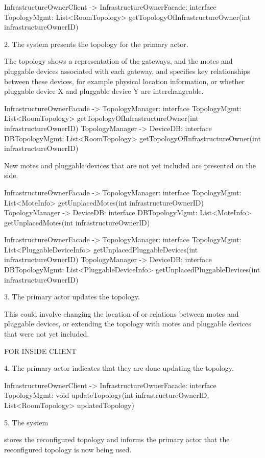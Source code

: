 {{{            InfrastructureOwnerClient -> InfrastructureOwnerFacade: interface TopologyMgmt: List<RoomTopology> getTopologyOfInfrastructureOwner(int infrastructureOwnerID)

        2. The system presents the topology for the primary actor.
           { The topology shows a representation of the gateways, and the motes and pluggable devices associated with each gateway,
           and specifies key relationships between these devices, for example physical location information,
           or whether pluggable device X and pluggable device Y are interchangeable.

            InfrastructureOwnerFacade -> TopologyManager: interface TopologyMgmt: List<RoomTopology> getTopologyOfInfrastructureOwner(int infrastructureOwnerID)
            TopologyManager -> DeviceDB: interface DBTopologyMgmt: List<RoomTopology> getTopologyOfInfrastructureOwner(int infrastructureOwnerID)

           { New motes and pluggable devices that are not yet included are presented on the side.

            InfrastructureOwnerFacade -> TopologyManager: interface TopologyMgmt: List<MoteInfo> getUnplacedMotes(int infrastructureOwnerID)
            TopologyManager -> DeviceDB: interface DBTopologyMgmt: List<MoteInfo> getUnplacedMotes(int infrastructureOwnerID)

            InfrastructureOwnerFacade -> TopologyManager: interface TopologyMgmt: List<PluggableDeviceInfo> getUnplacedPluggableDevices(int infrastructureOwnerID)
            TopologyManager -> DeviceDB: interface DBTopologyMgmt: List<PluggableDeviceInfo> getUnplacedPluggableDevices(int infrastructureOwnerID)

        3. The primary actor updates the topology.
           { This could involve changing the location of or relations between motes and pluggable devices,
           or extending the topology with motes and pluggable devices that were not yet included.

            FOR INSIDE CLIENT

        4. The primary actor indicates that they are done updating the topology.

            InfrastructureOwnerClient -> InfrastructureOwnerFacade: interface TopologyMgmt: void updateTopology(int infrastructureOwnerID, List<RoomTopology> updatedTopology)

        5. The system
           { stores the reconfigured topology and informs the primary actor that the reconfigured topology is now being used.

}}}}}}}

